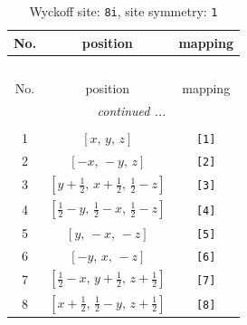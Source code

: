\documentclass[fleqn,8pt]{jsarticle}
\begin{document}
\renewcommand{\arraystretch}{1.2}
\begin{longtable}{ccc}
\caption{Wyckoff site: {\tt 8i}, site symmetry: {\tt 1}}
 \\
 \hline \hline
No. & position & mapping \\ \hline \endfirsthead

\multicolumn{2}{l}{\tablename\ \thetable{}} \\
 \hline \hline
No. & position & mapping \\ \hline \endhead

 \hline \hline
\multicolumn{2}{r}{\footnotesize\it continued ...} \\ \endfoot

 \hline \hline
\multicolumn{2}{r}{} \\ \endlastfoot

1 & $\left[ x,\, y,\, z \right]$ & {\tt [1]} \\ \hline
2 & $\left[ - x,\, - y,\, z \right]$ & {\tt [2]} \\ \hline
3 & $\left[ y + \frac{1}{2},\, x + \frac{1}{2},\, \frac{1}{2} - z \right]$ & {\tt [3]} \\ \hline
4 & $\left[ \frac{1}{2} - y,\, \frac{1}{2} - x,\, \frac{1}{2} - z \right]$ & {\tt [4]} \\ \hline
5 & $\left[ y,\, - x,\, - z \right]$ & {\tt [5]} \\ \hline
6 & $\left[ - y,\, x,\, - z \right]$ & {\tt [6]} \\ \hline
7 & $\left[ \frac{1}{2} - x,\, y + \frac{1}{2},\, z + \frac{1}{2} \right]$ & {\tt [7]} \\ \hline
8 & $\left[ x + \frac{1}{2},\, \frac{1}{2} - y,\, z + \frac{1}{2} \right]$ & {\tt [8]} \\
\end{longtable}
\end{document}
